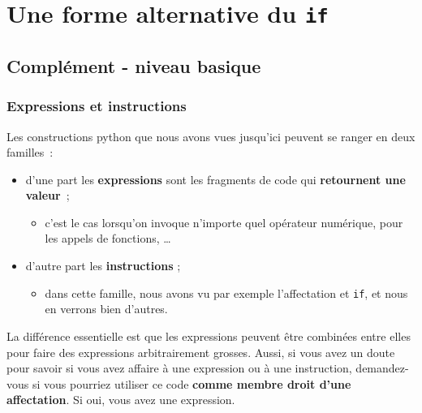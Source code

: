     \hypertarget{une-forme-alternative-du-if}{%
\section{\texorpdfstring{Une forme alternative du
\texttt{if}}{Une forme alternative du if}}\label{une-forme-alternative-du-if}}

    \hypertarget{compluxe9ment---niveau-basique}{%
\subsection{Complément - niveau
basique}\label{compluxe9ment---niveau-basique}}

    \hypertarget{expressions-et-instructions}{%
\subsubsection{Expressions et
instructions}\label{expressions-et-instructions}}

    Les constructions python que nous avons vues jusqu'ici peuvent se ranger
en deux familles~:

\begin{itemize}
\tightlist
\item
  d'une part les \textbf{expressions} sont les fragments de code qui
  \textbf{retournent une valeur}~;

  \begin{itemize}
  \tightlist
  \item
    c'est le cas lorsqu'on invoque n'importe quel opérateur numérique,
    pour les appels de fonctions, \ldots{}
  \end{itemize}
\item
  d'autre part les \textbf{instructions} ;

  \begin{itemize}
  \tightlist
  \item
    dans cette famille, nous avons vu par exemple l'affectation et
    \texttt{if}, et nous en verrons bien d'autres.
  \end{itemize}
\end{itemize}

La différence essentielle est que les expressions peuvent être combinées
entre elles pour faire des expressions arbitrairement grosses. Aussi, si
vous avez un doute pour savoir si vous avez affaire à une expression ou
à une instruction, demandez-vous si vous pourriez utiliser ce code
\textbf{comme membre droit d'une affectation}. Si oui, vous avez une
expression.

